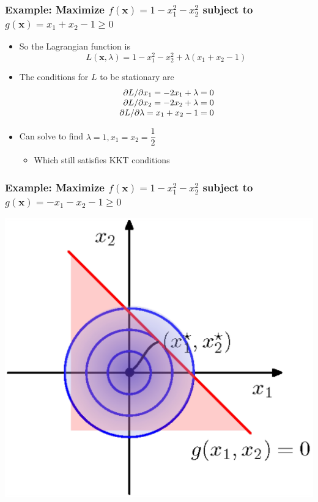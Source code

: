 \documentclass[12pt,notes,mathserif]{beamer}
\begin{document}
\begin{frame}[c]
\frametitle{Example: Maximize $f(\mathbf{x})=1-x_1^2-x_2^2$ subject to $g(\mathbf{x})=x_1+x_2-1\geqslant{}0$}
\begin{itemize}
\item So the Lagrangian function is 
\[
L(\mathbf{x},\lambda)=1-x_1^2-x_2^2+\lambda(x_1+x_2-1)
\]
\item The conditions for $L$ to be stationary are 
\[
\begin{array}{r@{~}l}
\partial L/\partial x_1=-2x_1+\lambda=0\\
\partial L/\partial x_2=-2x_2+\lambda=0\\
\partial L/\partial \lambda=x_1+x_2-1=0\\
\end{array}
\]
\item Can solve to find $\lambda=1,x_1=x_2=\dfrac{1}{2}$
\begin{itemize}
\item Which still satisfies KKT conditions
\end{itemize}
\end{itemize}
\end{frame}


\begin{frame}[c]
\frametitle{Example: Maximize $f(\mathbf{x})=1-x_1^2-x_2^2$ subject to $g(\mathbf{x})=-x_1-x_2-1\geqslant{}0$}
\begin{center}
\includegraphics[width=0.65\linewidth]{fig8/lec837.jpg}
\end{center}
\end{frame}
\end{document}
